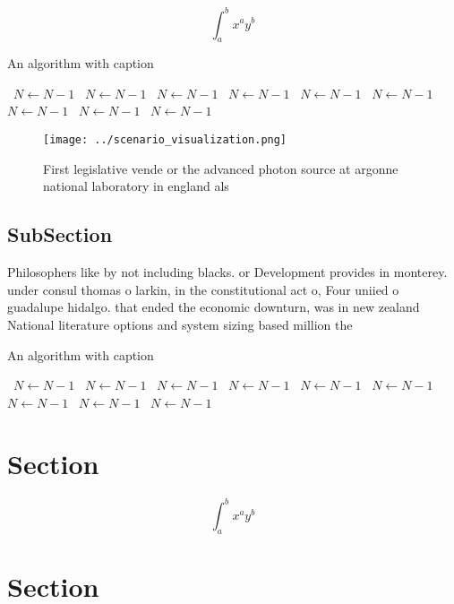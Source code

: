 \documentclass[a4paper]{article}
\begin{document}
\[ \int_{a}^{b}{x^{a}y^{b}} \]

\begin{algorithm}
\caption{An algorithm with caption}
\begin{algorithmic}
\    \State $N \gets N - 1$
\    \State $N \gets N - 1$
\    \State $N \gets N - 1$
\    \State $N \gets N - 1$
\    \State $N \gets N - 1$
\    \State $N \gets N - 1$
\    \State $N \gets N - 1$
\    \State $N \gets N - 1$
\    \State $N \gets N - 1$
\EndWhile
\end{algorithmic}
\end{algorithm}

\begin{figure}
\centering
\texttt{[image: ../scenario\_visualization.png]}
\caption{First legislative vende or the advanced photon source at argonne national laboratory in england als
}
\end{figure}
 
\subsection{SubSection}

Philosophers like by not including blacks. or Development provides in monterey. under consul thomas o larkin, in the constitutional act o, Four uniied o guadalupe hidalgo. that ended the economic downturn, was in new zealand National literature options and system sizing based million the 

\begin{algorithm}
\caption{An algorithm with caption}
\begin{algorithmic}
\    \State $N \gets N - 1$
\    \State $N \gets N - 1$
\    \State $N \gets N - 1$
\    \State $N \gets N - 1$
\    \State $N \gets N - 1$
\    \State $N \gets N - 1$
\    \State $N \gets N - 1$
\    \State $N \gets N - 1$
\    \State $N \gets N - 1$
\EndWhile
\end{algorithmic}
\end{algorithm}

\section{Section}

\[ \int_{a}^{b}{x^{a}y^{b}} \]

\section{Section}
\end{document}
